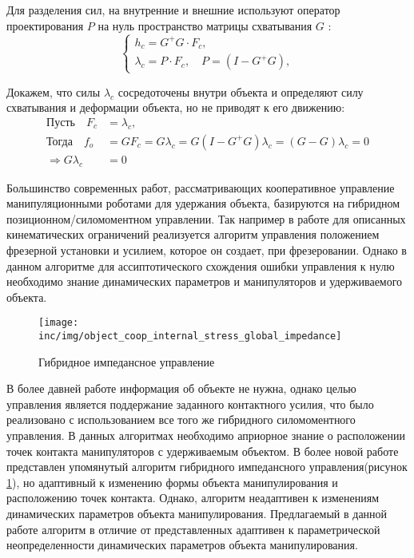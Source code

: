 Для разделения сил, на внутренние и внешние используют оператор проектирования $P$ на нуль пространство матрицы схватывания $G$ \cite{Lin2017}:
\begin{equation}
  \begin{cases}
    h_c = G^+G\cdot F_c,\\
    \lambda_c = P\cdot F_c, \quad P = (I - G^+G),
  \end{cases}
\end{equation}

Докажем, что силы $\lambda_c$ сосредоточены внутри объекта и определяют силу схватывания и деформации объекта, но не приводят к его движению:
        \begin{align}
            \text{Пусть}\quad F_c &= \lambda_c, \nonumber \\
            \text{Тогда}\quad  f_o &= GF_c = G\lambda_c  = G(I - G^+G)\lambda_c = (G - G)\lambda_c = 0 \nonumber \\
            \Rightarrow G\lambda_c &= 0
        \end{align}

Большинство современных работ, рассматривающих кооперативное управление манипуляционными роботами для удержания объекта, базируются на гибридном позиционном/силомоментном управлении. Так например в работе \cite{AzizZadeh2019} для описанных кинематических ограничений реализуется алгоритм  управления положением фрезерной установки и усилием, которое он создает, при фрезеровании. Однако в данном алгоритме для ассиптотического схождения ошибки управления к нулю необходимо знание динамических параметров и манипуляторов и удерживаемого объекта.

\begin{figure}[ht]
  \centering
  \texttt{[image: inc/img/object\_coop\_internal\_stress\_global\_impedance]}
  \caption{Гибридное импедансное управление}
  \label{object_coop_internal_stress_global_impedance}
\end{figure}

В более давней работе \cite{Lin2017} информация об объекте не нужна, однако целью управления является поддержание заданного контактного усилия, что было реализовано с использованием все того же гибридного силомоментного управления. В данных алгоритмах необходимо априорное знание о расположении точек контакта манипуляторов с удерживаемым объектом. В более новой работе \cite{Jiao2020} представлен  упомянутый алгоритм гибридного импедансного управления(рисунок \ref{object_coop_internal_stress_global_impedance}), но адаптивный к изменению формы объекта манипулирования и расположению точек контакта. Однако, алгоритм неадаптивен к изменениям динамических параметров объекта манипулирования.
Предлагаемый в данной работе алгоритм в отличие от представленных адаптивен к параметрической неопределенности динамических параметров объекта манипулирования.




